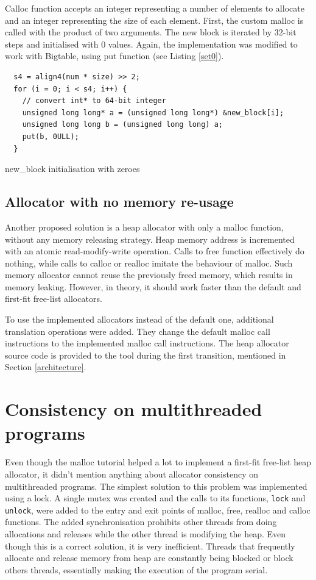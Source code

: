 \documentclass[bsc,frontabs,twoside,singlespacing,parskip,deptreport]{infthesis}     %
\begin{document}
Calloc function accepts an integer representing a number of elements to allocate and an integer representing the size of each element. First, the custom malloc is called with the product of two arguments. The new block is iterated by 32-bit steps and initialised with 0 values. Again, the implementation was modified to work with Bigtable, using put function (see Listing \ref{set0}).

\begin{listing}
\begin{verbatim}
  s4 = align4(num * size) >> 2;
  for (i = 0; i < s4; i++) {
    // convert int* to 64-bit integer
    unsigned long long* a = (unsigned long long*) &new_block[i];
    unsigned long long b = (unsigned long long) a;
    put(b, 0ULL);
  }
\end{verbatim}
\caption{new\_block initialisation with zeroes}
\label{set0}
\end{listing}

\subsection{Allocator with no memory re-usage}

Another proposed solution is a heap allocator with only a malloc function, without any memory releasing strategy. Heap memory address is incremented with an atomic read-modify-write operation. Calls to free function effectively do nothing, while calls to calloc or realloc imitate the behaviour of malloc. Such memory allocator cannot reuse the previously freed memory, which results in memory leaking. However, in theory, it should work faster than the default and first-fit free-list allocators.

To use the implemented allocators instead of the default one, additional translation operations were added. They change the default malloc call instructions to the implemented malloc call instructions. The heap allocator source code is provided to the tool during the first transition, mentioned in Section \ref{architecture}.

\section{Consistency on multithreaded programs}
\label{consistency}
Even though the malloc tutorial helped a lot to implement a first-fit free-list heap allocator, it didn't mention anything about allocator consistency on multithreaded programs. The simplest solution to this problem was implemented using a lock. A single mutex was created and the calls to its functions, \texttt{lock} and \texttt{unlock}, were added to the entry and exit points of malloc, free, realloc and calloc functions. The added synchronisation prohibits other threads from doing allocations and releases while the other thread is modifying the heap. Even though this is a correct solution, it is very inefficient. Threads that frequently allocate and release memory from heap are constantly being blocked or block others threads, essentially making the execution of the program serial.
\end{document}
